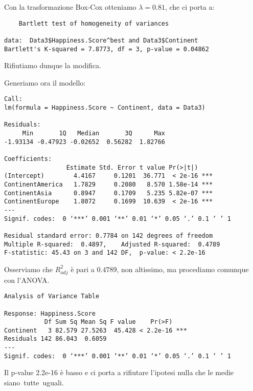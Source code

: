 \documentclass{beamer}
\begin{document}
\begin{frame}[fragile]
    Con la trasformazione Box-Cox otteniamo $\lambda=0.81$, che ci porta a:
    \tiny
    \begin{verbatim}
    Bartlett test of homogeneity of variances

data:  Data3$Happiness.Score^best and Data3$Continent
Bartlett's K-squared = 7.8773, df = 3, p-value = 0.04862 
    \end{verbatim}

    \normalsize Rifiutiamo dunque la modifica.
\end{frame}

\begin{frame}[fragile]
    Generiamo ora il modello:
    \tiny
    \begin{verbatim}
Call:
lm(formula = Happiness.Score ~ Continent, data = Data3)

Residuals:
     Min       1Q   Median       3Q      Max 
-1.93134 -0.47923 -0.02652  0.56282  1.82766 

Coefficients:
                 Estimate Std. Error t value Pr(>|t|)    
(Intercept)        4.4167     0.1201  36.771  < 2e-16 ***
ContinentAmerica   1.7829     0.2080   8.570 1.58e-14 ***
ContinentAsia      0.8947     0.1709   5.235 5.82e-07 ***
ContinentEurope    1.8072     0.1699  10.639  < 2e-16 ***
---
Signif. codes:  0 ‘***’ 0.001 ‘**’ 0.01 ‘*’ 0.05 ‘.’ 0.1 ‘ ’ 1

Residual standard error: 0.7784 on 142 degrees of freedom
Multiple R-squared:  0.4897,    Adjusted R-squared:  0.4789 
F-statistic: 45.43 on 3 and 142 DF,  p-value: < 2.2e-16
    \end{verbatim}
\end{frame}

\begin{frame}[fragile]
    Osserviamo che $R^2_{adj}$ è pari a $0.4789$, non altissimo, ma procediamo comunque con l'ANOVA.

    \bigskip

    \tiny
    \begin{verbatim}
Analysis of Variance Table

Response: Happiness.Score
           Df Sum Sq Mean Sq F value    Pr(>F)    
Continent   3 82.579 27.5263  45.428 < 2.2e-16 ***
Residuals 142 86.043  0.6059                      
---
Signif. codes:  0 ‘***’ 0.001 ‘**’ 0.01 ‘*’ 0.05 ‘.’ 0.1 ‘ ’ 1
    \end{verbatim}

    \normalsize Il p-value 2.2e-16 è basso e ci porta a rifiutare l'ipotesi nulla che le medie siano tutte uguali.
\end{frame}
\end{document}
